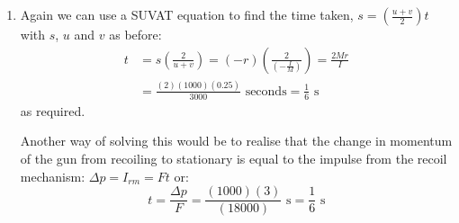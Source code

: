 \begin{problem}[A1972AMIIQ2l]
{\begin{enumerate}
	\item Again we can use a SUVAT equation to find the time taken, $s = \left( \frac{u + v}{2} \right)t$ with $s$, $u$ and $v$ as before:
\begin{align*} t &= s \left( \frac{2}{u + v} \right) = (-r) \left( \frac{2}{\left( -\frac{I}{M} \right)} \right) = \frac{2Mr}{I} \\ &= \frac{(2)(1000)(0.25)}{3000} \textrm{ seconds} = \frac{1}{6} \textrm{ s} \end{align*} as required.

Another way of solving this would be to realise that the change in momentum of the gun from recoiling to stationary is equal to the impulse from the recoil mechanism: $ \Delta p = I_{rm} = Ft$ or:
\begin{equation*} t = \frac{\Delta p}{F} = \frac{(1000)(3)}{(18000)} \textrm{ s} = \frac{1}{6} \textrm{ s} \end{equation*}

\end{enumerate}}
\end{problem}